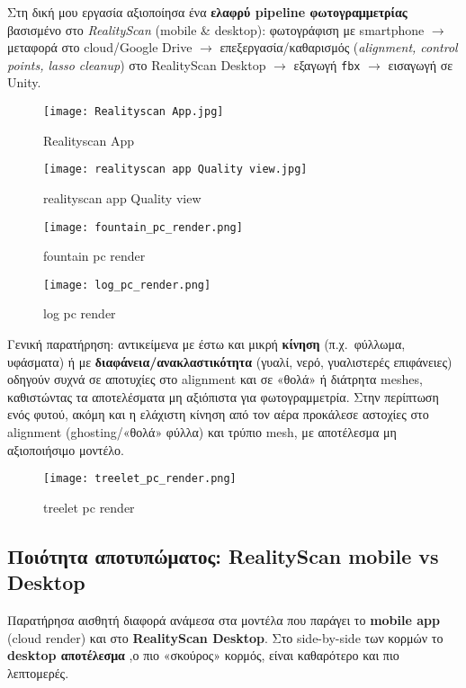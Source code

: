 Στη δική μου εργασία αξιοποίησα ένα \textbf{ελαφρύ pipeline φωτογραμμετρίας} βασισμένο στο \emph{RealityScan} (mobile \& desktop): φωτογράφιση με smartphone $\rightarrow$ μεταφορά στο cloud/Google Drive $\rightarrow$ επεξεργασία/καθαρισμός (\emph{alignment, control points, lasso cleanup}) στο RealityScan Desktop $\rightarrow$ εξαγωγή \texttt{fbx} $\rightarrow$ εισαγωγή σε Unity.



\begin{figure}[H]
    \centering
    \texttt{[image: Realityscan App.jpg]}
    \caption{Realityscan App}
    \label{fig:placeholder}
\end{figure}

\begin{figure}[H]
    \centering
    \texttt{[image: realityscan app Quality view.jpg]}
    \caption{realityscan app Quality view}
    \label{fig:placeholder}
\end{figure}
\begin{figure}[H]
    \centering
    \texttt{[image: fountain\_pc\_render.png]}
    \caption{fountain pc render}
    \label{fig:placeholder}
\end{figure}
\begin{figure}[H]
    \centering
    \texttt{[image: log\_pc\_render.png]}
    \caption{log pc render}
    \label{fig:placeholder}
\end{figure}



Γενική παρατήρηση: αντικείμενα με έστω και μικρή \textbf{κίνηση} (π.χ.\ φύλλωμα, υφάσματα) ή με \textbf{διαφάνεια/ανακλαστικότητα} (γυαλί, νερό, γυαλιστερές επιφάνειες) οδηγούν συχνά σε αποτυχίες στο alignment και σε «θολά» ή διάτρητα meshes, καθιστώντας τα αποτελέσματα μη αξιόπιστα για φωτογραμμετρία. Στην περίπτωση ενός φυτού, ακόμη και η ελάχιστη κίνηση από τον αέρα προκάλεσε αστοχίες στο alignment (ghosting/«θολά» φύλλα) και τρύπιο mesh, με αποτέλεσμα μη αξιοποιήσιμο μοντέλο.

\begin{figure}[H]
    \centering
    \texttt{[image: treelet\_pc\_render.png]}
    \caption{treelet pc render}
    \label{fig:placeholder}
\end{figure}
\subsection*{Ποιότητα αποτυπώματος: RealityScan mobile vs Desktop}
Παρατήρησα αισθητή διαφορά ανάμεσα στα μοντέλα που παράγει το \textbf{mobile app} (cloud render) και στο \textbf{RealityScan Desktop}. Στο side-by-side των κορμών  το \textbf{desktop αποτέλεσμα} ,ο πιο «σκούρος» κορμός, είναι καθαρότερο και πιο λεπτομερές.

